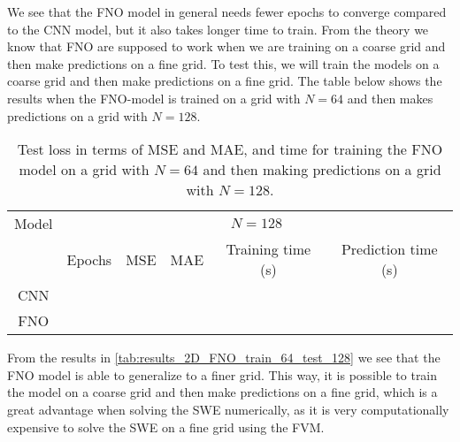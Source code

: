 We see that the FNO model in general needs fewer epochs to converge compared to the CNN model, but it also takes longer time to train.
From the theory we know that FNO are supposed to work when we are training on a coarse grid and then make predictions on a fine grid.
To test this, we will train the models on a coarse grid and then make predictions on a fine grid.
The table below shows the results when the FNO-model is trained on a grid with $N = 64$ and then makes predictions on a grid with $N = 128$.
\begin{table}[H]
    \centering
    \begin{tabular}{c|ccccc}
        Model & \multicolumn{5}{c}{$N = 128$} \\
        \cline{2-6}
        & Epochs & MSE & MAE & Training time (s) & Prediction time (s) \\
        \hline
        CNN &
         &
         &
         &
         &
         \\
        FNO  &
         &
         &
         &
         &
         
    \end{tabular}
    \caption{Test loss in terms of MSE and MAE, and time for training the FNO model on a grid with $N = 64$ and then making predictions on a grid with $N = 128$.}\label{tab:results_2D_FNO_train_64_test_128}
\end{table}
From the results in \autoref{tab:results_2D_FNO_train_64_test_128} we see that the FNO model is able to generalize to a finer grid.
This way, it is possible to train the model on a coarse grid and then make predictions on a fine grid, which is a great advantage when solving the SWE numerically, as it is very computationally expensive to solve the SWE on a fine grid using the FVM.
